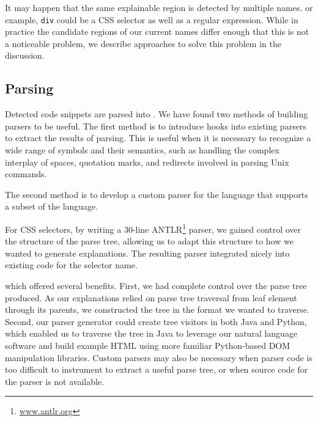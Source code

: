 \begin{changes}
It may happen that the same explainable region is detected by multiple \Glspl{name}.
or example, \texttt{div} could be a CSS selector as well as a regular expression.
While in practice the candidate regions of our current \Glspl{name} differ enough that this is not a noticeable problem, we describe approaches to solve this problem in the discussion.
\end{changes}

\subsection{Parsing}
Detected code snippets are parsed into .
We have found two methods of building parsers to be useful. The first method is to introduce hooks into existing parsers to extract the results of parsing.  This is useful 
when it is necessary to recognize a wide range of symbols and their semantics, %
such as handling the complex interplay of spaces, quotation marks, and redirects involved in parsing Unix commands.

The second method is to develop a custom parser for the language that supports a subset of the language.
\begin{changes}
For CSS selectors, by writing a 30-line ANTLR\footnote{\url{www.antlr.org}} parser, we gained control over the structure of the parse tree, allowing us to adapt this structure to how we wanted to generate explanations.
The resulting parser integrated nicely into existing code for the selector \Gls{name}.
\end{changes}
which offered several benefits.
First, we had complete control over the parse tree produced.
As our explanations relied on parse tree traversal from leaf element through its parents, we constructed the tree in the format we wanted to traverse.
Second, our parser generator could create tree visitors in both Java and Python, which enabled us to traverse the tree in Java to leverage our natural language software and build example HTML using more familiar Python-based DOM manipulation libraries.
Custom parsers may also be necessary when parser code is too difficult to instrument to extract a useful parse tree, or when source code for the parser is not available.
\fi

